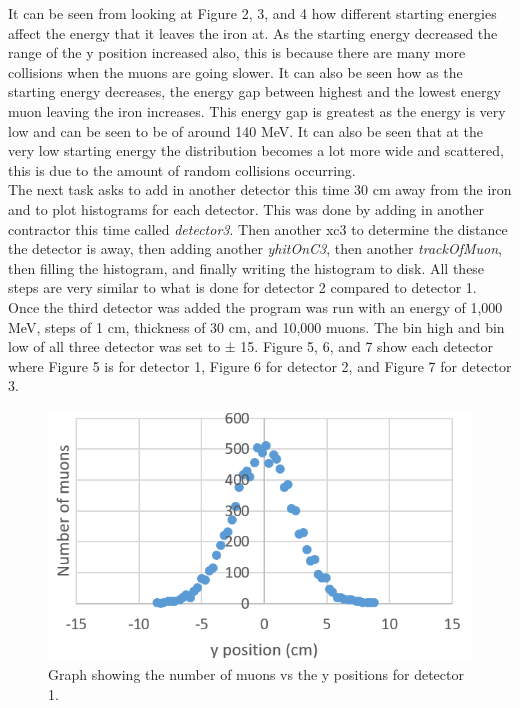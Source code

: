 \documentclass[twocolumn]{article}
\begin{document}
\indent It can be seen from looking at Figure 2, 3, and 4 how different starting energies affect the energy that it leaves the iron at. As the starting energy decreased the range of the y position increased also, this is because there are many more collisions when the muons are going slower. It can also be seen how as the starting energy decreases, the energy gap between highest and the lowest energy muon leaving the iron increases. This energy gap is greatest as the energy is very low and can be seen to be of around 140 MeV. It can also be seen that at the very low starting energy the distribution becomes a lot more wide and scattered, this is due to the amount of random collisions occurring.\\\indent The next task asks to add in another detector this time 30 cm away from the iron and to plot histograms for each detector. This was done by adding in another contractor this time called \textit{detector3}. Then another xc3 to determine the distance the detector is away, then adding another \textit{yhitOnC3}, then another \textit{trackOfMuon}, then filling the histogram, and finally writing the histogram to disk. All these steps are very similar to what is done for detector 2 compared to detector 1. Once the third detector was added the program was run with an energy of 1,000 MeV, steps of 1 cm, thickness of 30 cm, and 10,000 muons. The bin high and bin low of all three detector was set to ± 15. Figure 5, 6, and 7 show each detector where Figure 5 is for detector 1, Figure 6 for detector 2, and Figure 7 for detector 3.
\begin{figure}
	\includegraphics[scale=0.3]{Images/Graph5.png}
	\caption{\label{graph5}Graph showing the number of muons vs the y positions for detector 1.}
\end{figure}
\end{document}
